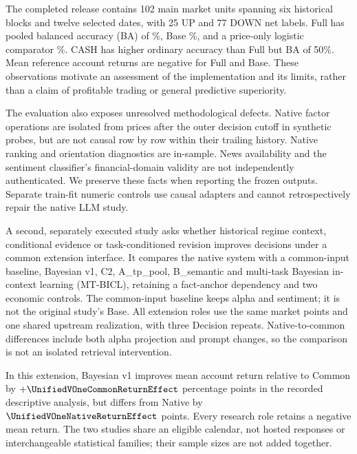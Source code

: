The completed release contains 102 main market units spanning six historical blocks and twelve selected dates, with 25 UP and 77 DOWN net labels. Full has pooled balanced accuracy (BA) of \FullBA\%, Base \BaseBA\%, and a price-only logistic comparator \LogisticPriceBA\%. CASH has higher ordinary accuracy than Full but BA of 50\%. Mean reference account returns are negative for Full and Base. These observations motivate an assessment of the implementation and its limits, rather than a claim of profitable trading or general predictive superiority.

The evaluation also exposes unresolved methodological defects. Native factor operations are isolated from prices after the outer decision cutoff in synthetic probes, but are not causal row by row within their trailing history. Native ranking and orientation diagnostics are in-sample. News availability and the sentiment classifier's financial-domain validity are not independently authenticated. We preserve these facts when reporting the frozen outputs. Separate train-fit numeric controls use causal adapters and cannot retrospectively repair the native LLM study.

A second, separately executed study asks whether historical regime context, conditional evidence or task-conditioned revision improves decisions under a common extension interface. It compares the native system with a common-input baseline, Bayesian v1, C2, A\_tp\_pool, B\_semantic and multi-task Bayesian in-context learning (MT-BICL), retaining a fact-anchor dependency and two economic controls. The common-input baseline keeps alpha and sentiment; it is not the original study's Base. All extension roles use the same market points and one shared upstream realization, with three Decision repeats. Native-to-common differences include both alpha projection and prompt changes, so the comparison is not an isolated retrieval intervention.

In this extension, Bayesian v1 improves mean account return relative to Common by $+\UnifiedVOneCommonReturnEffect$ percentage points in the recorded descriptive analysis, but differs from Native by $\UnifiedVOneNativeReturnEffect$ points. Every research role retains a negative mean return. The two studies share an eligible calendar, not hosted responses or interchangeable statistical families; their sample sizes are not added together.

